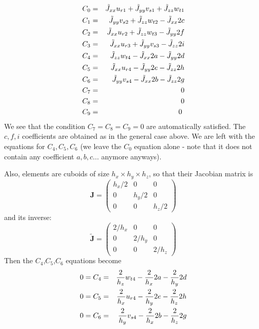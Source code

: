 \begin{eqnarray}
C_0 &=& \tilde{J}_{xx} u_{r1} + \tilde{J}_{yy} v_{s1} +\tilde{J}_{zz} w_{t1} \nn\\
C_1 &=& \tilde{J}_{yy} v_{s2} + \tilde{J}_{zz} w_{t2} -\tilde{J}_{xx} 2c \nn \\ %
C_2 &=& \tilde{J}_{xx} u_{r2} + \tilde{J}_{zz} w_{t3} -\tilde{J}_{yy} 2f \nn\\ %
C_3 &=& \tilde{J}_{xx} u_{r3} + \tilde{J}_{yy} v_{s3} -\tilde{J}_{zz} 2i \nn\\ %
C_4 &=& \tilde{J}_{zz} w_{t4} - \tilde{J}_{xx} 2a - \tilde{J}_{yy} 2d  \nn\\ %
C_5 &=& \tilde{J}_{xx} u_{r4} - \tilde{J}_{yy} 2e - \tilde{J}_{zz} 2h  \nn\\ %
C_6 &=& \tilde{J}_{yy} v_{s4} - \tilde{J}_{xx} 2b - \tilde{J}_{zz} 2g  \nn\\ %
C_7 &=& 0  \nn\\ 
C_8 &=& 0  \nn\\ 
C_9 &=& 0  \nn\
\end{eqnarray}
We see that the condition $C_7=C_8=C_9=0$ are automatically satisfied.
The $c,f,i$ coefficients are obtained as in the general case above. We are left with the 
equations for $C_4,C_5,C_6$ (we leave the $C_0$ equation alone - note that 
it does not contain any coefficient $a,b,c...$ anymore anyways).

Also, elements are cuboids of size $h_x\times h_y \times h_z$, 
so that their Jacobian matrix is 
\[
{\bm J} =
\left(
\begin{array}{ccc}
h_x/2 & 0 & 0 \\
0 & h_y/2 & 0 \\
0 & 0 & h_z/2
\end{array}
\right) 
\]
and its inverse:
\[
\tilde{\bm J} = 
\left(
\begin{array}{ccc}
2/h_x & 0 & 0 \\
0 & 2/h_y & 0 \\
0 & 0 & 2/h_z
\end{array}
\right) 
\]
Then the $C_4$,$C_5$,$C_6$ equations become 
\begin{eqnarray}
0=C_4 &=& \frac{2}{h_z} w_{t4} - \frac{2}{h_x} 2a - \frac{2}{h_y}  2d  \nonumber\\ 
0=C_5 &=& \frac{2}{h_x} u_{r4} - \frac{2}{h_y} 2e - \frac{2}{h_z}  2h  \nonumber\\ 
0=C_6 &=& \frac{2}{h_y} v_{s4} - \frac{2}{h_x} 2b - \frac{2}{h_z}  2g  
\end{eqnarray}

